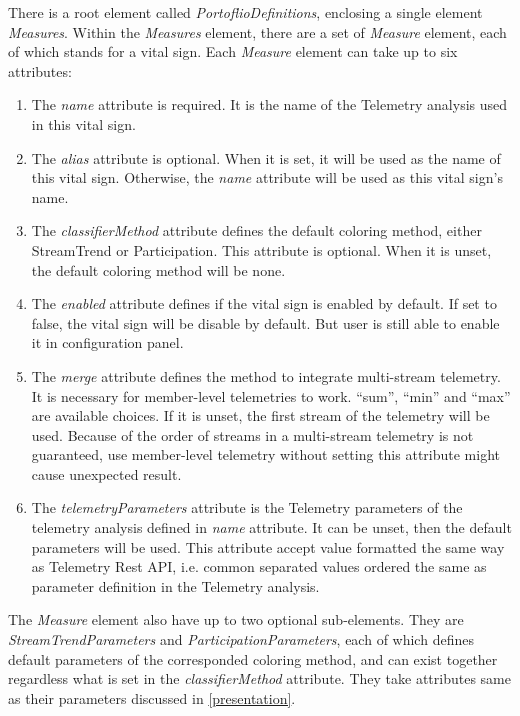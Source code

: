There is a root element called {\it PortoflioDefinitions}, enclosing a single element {\it Measures}. Within the {\it Measures} element, there are a set of {\it Measure} element, each of which stands for a vital sign. Each {\it Measure} element can take up to six attributes:
\begin{enumerate}
\item The {\it name} attribute is required. It is the name of the Telemetry analysis used in this vital sign.
\item The {\it alias} attribute is optional. When it is set, it will be used as the name of this vital sign. Otherwise, the {\it name} attribute will be used as this vital sign's name.
\item The {\it classifierMethod} attribute defines the default coloring method, either StreamTrend or Participation. This attribute is optional. When it is unset, the default coloring method will be none.
\item The {\it enabled} attribute defines if the vital sign is enabled by default. If set to false, the vital sign will be disable by default. But user is still able to enable it in configuration panel.
\item The {\it merge} attribute defines the method to integrate multi-stream telemetry. It is necessary for member-level telemetries to work. ``sum'', ``min'' and ``max'' are available choices. If it is unset, the first stream of the telemetry will be used. Because of the order of streams in a multi-stream telemetry is not guaranteed, use member-level telemetry without setting this attribute might cause unexpected result.
\item The {\it telemetryParameters} attribute is the Telemetry parameters of the telemetry analysis defined in {\it name} attribute. It can be unset, then the default parameters will be used. This attribute accept value formatted the same way as Telemetry Rest API, i.e. common separated values ordered the same as parameter definition in the Telemetry analysis.
\end{enumerate}

The {\it Measure} element also have up to two optional sub-elements. They are {\it StreamTrendParameters} and {\it ParticipationParameters}, each of which defines default parameters of the corresponded coloring method, and can exist together regardless what is set in the {\it classifierMethod} attribute. They take attributes same as their parameters discussed in \autoref{presentation}.


